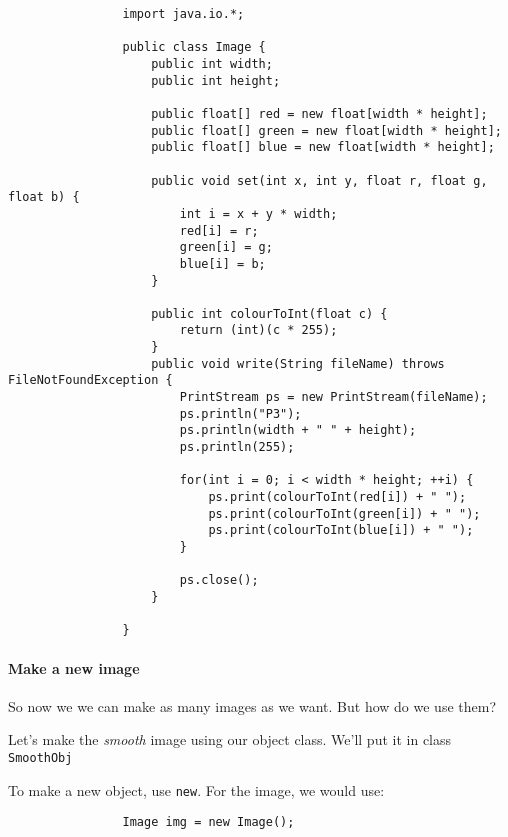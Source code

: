 \documentclass{article}
\begin{document}
            \begin{verbatim}
                import java.io.*;

                public class Image {
                    public int width;
                    public int height;
    
                    public float[] red = new float[width * height];
                    public float[] green = new float[width * height];
                    public float[] blue = new float[width * height];    

                    public void set(int x, int y, float r, float g, float b) {
                        int i = x + y * width;
                        red[i] = r;
                        green[i] = g;
                        blue[i] = b;
                    }

                    public int colourToInt(float c) {
                        return (int)(c * 255);
                    }
                    public void write(String fileName) throws FileNotFoundException {
                        PrintStream ps = new PrintStream(fileName);
                        ps.println("P3");
                        ps.println(width + " " + height);
                        ps.println(255);
        
                        for(int i = 0; i < width * height; ++i) {
                            ps.print(colourToInt(red[i]) + " ");
                            ps.print(colourToInt(green[i]) + " ");
                            ps.print(colourToInt(blue[i]) + " ");
                        }
        
                        ps.close();
                    }
                    
                }
            \end{verbatim}
        
        \newpage
        \paragraph{Make a new image}
            So now we we can make as many images as we want. But how do we use them?
            
            Let's make the \emph{smooth} image using our object class.  We'll put it in class \texttt{SmoothObj}
            
            To make a new object, use \texttt{new}.  For the image, we would use:

            \begin{verbatim}
                Image img = new Image();
            \end{verbatim}
            
\end{document}
